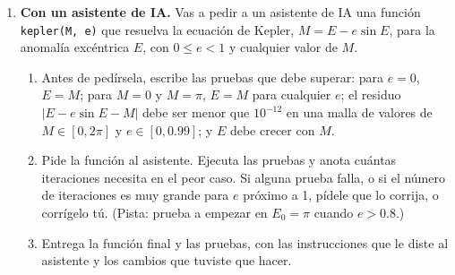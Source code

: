 \begin{enumerate}
\item \label{ej:kepler_ia} \textbf{Con un asistente de IA.} Vas a pedir a un asistente de IA una función \texttt{kepler(M, e)} que resuelva la ecuación de Kepler, $M = E - e\sin E$, para la anomalía excéntrica $E$, con $0\leq e<1$ y cualquier valor de $M$.
\begin{enumerate}
\item Antes de pedírsela, escribe las pruebas que debe superar: para $e=0$, $E=M$; para $M=0$ y $M=\pi$, $E=M$ para cualquier $e$; el residuo $\vert E-e\sin E-M\vert$ debe ser menor que $10^{-12}$ en una malla de valores de $M\in[0,2\pi]$ y $e\in[0,0.99]$; y $E$ debe crecer con $M$.
\item Pide la función al asistente. Ejecuta las pruebas y anota cuántas iteraciones necesita en el peor caso. Si alguna prueba falla, o si el número de iteraciones es muy grande para $e$ próximo a 1, pídele que lo corrija, o corrígelo tú. (Pista: prueba a empezar en $E_0=\pi$ cuando $e>0.8$.)
\item Entrega la función final y las pruebas, con las instrucciones que le diste al asistente y los cambios que tuviste que hacer.
\end{enumerate}
\end{enumerate}

